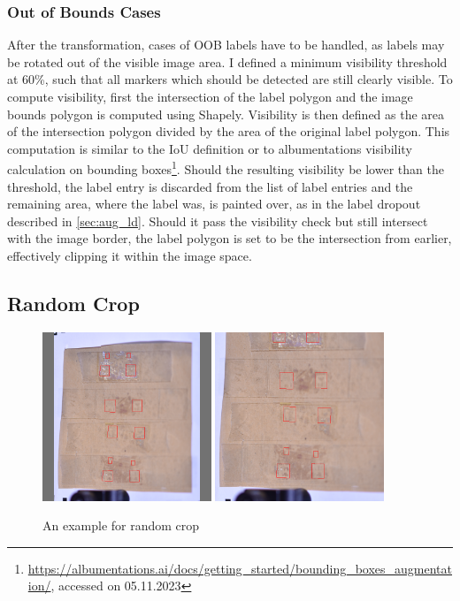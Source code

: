 \documentclass[10pt]{book}
\begin{document}
\subsubsection{Out of Bounds Cases}
\label{sec:oob}

After the transformation, cases of \ac{OOB} labels have to be handled, as labels may be rotated out of the visible image area. I defined a minimum visibility threshold at 60\%, such that all markers which should be detected are still clearly visible. To compute visibility, first the intersection of the label polygon and the image bounds polygon is computed using Shapely. Visibility is then defined as the area of the intersection polygon divided by the area of the original label polygon. This computation is similar to the \ac{IoU} definition or to albumentations visibility calculation on bounding boxes\footnote{\url{https://albumentations.ai/docs/getting_started/bounding_boxes_augmentation/}, accessed on 05.11.2023}. Should the resulting visibility be lower than the threshold, the label entry is discarded from the list of label entries and the remaining area, where the label was, is painted over, as in the label dropout described in \autoref{sec:aug_ld}. Should it pass the visibility check but still intersect with the image border, the label polygon is set to be the intersection from earlier, effectively clipping it within the image space.

\subsection{Random Crop}

\begin{figure}
  \centering
     {\includegraphics[width=0.45\textwidth]{image/aug_rc_before}}
     {\includegraphics[width=0.45\textwidth]{image/aug_rc_after}}
  \caption{An example for random crop}
  \label{fig:aug_rc_example}
\end{figure}
\end{document}
